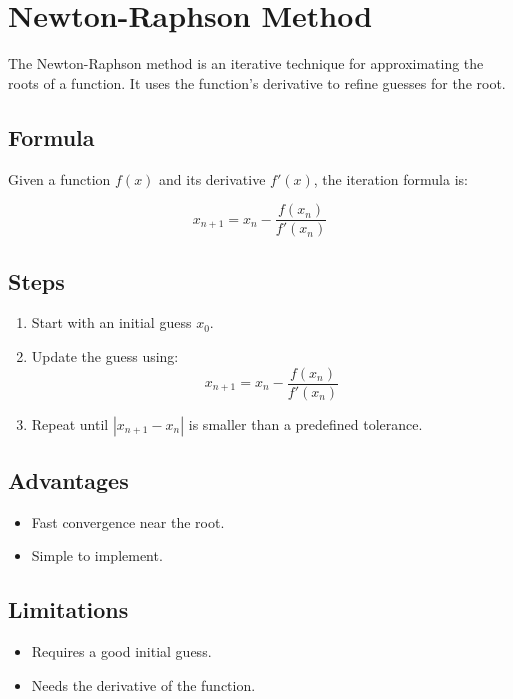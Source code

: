 \documentclass{scrreprt}
\begin{document}
\section*{Newton-Raphson Method}

The Newton-Raphson method is an iterative technique for approximating the roots of a function. It uses the function's derivative to refine guesses for the root.

\subsection*{Formula}

Given a function \( f(x) \) and its derivative \( f'(x) \), the iteration formula is:

\begin{equation}
x_{n+1} = x_n - \frac{f(x_n)}{f'(x_n)}
\end{equation}

\subsection*{Steps}

\begin{enumerate}
    \item Start with an initial guess \( x_0 \).
    \item Update the guess using:
    \begin{equation}
    x_{n+1} = x_n - \frac{f(x_n)}{f'(x_n)}
    \end{equation}
    \item Repeat until \( |x_{n+1} - x_n| \) is smaller than a predefined tolerance.
\end{enumerate}

\subsection*{Advantages}

\begin{itemize}
    \item Fast convergence near the root.
    \item Simple to implement.
\end{itemize}

\subsection*{Limitations}

\begin{itemize}
    \item Requires a good initial guess.
    \item Needs the derivative of the function.
\end{itemize}
\end{document}
